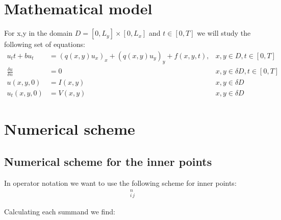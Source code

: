 \documentclass[twoside]{article}
\begin{document}
\section{Mathematical model}
\label{Model}
For x,y in the domain $D = [0,L_y] \times [0,L_x]$ and $t \in [0,T]$ we will study the following set  of equations:
\begin{align}
u_tt + b u_t &= (q(x,y)u_x)_x + (q(x,y)u_y)_y +f(x,y,t), &x,y \in D, t \in [0, T] \\
\frac{\delta u}{\delta n} &= 0 &x,y \in \delta D,  t \in [0, T] \\
u(x,y,0) &= I(x,y) &x,y \in \delta D \\
u_t(x,y,0) &= V(x,y) &x,y \in \delta D
\end{align}






\section{Numerical scheme}
\label{Scheme}
\subsection{Numerical scheme for the inner points}
In operator notation we want to use the following scheme for inner points:
\begin{align}
[D_t D_t u + b D_2t u = D_x(q D_x u) + D_y (q D_y u) +f]_{i\, j}^n \label{PDE}
\end{align}

Calculating each summand we find:
\end{document}
